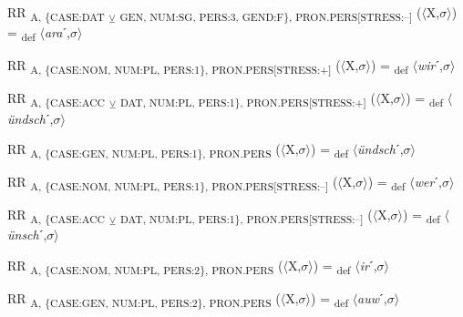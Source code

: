 {\begin{exe}
 RR \textsubscript{A, \{CASE:DAT} \textsubscript{${\veebar}$}\textsubscript{ GEN, NUM:SG, PERS:3, GEND:F\}, PRON.PERS[STRESS:–]} ($\langle$X,$\sigma $$\rangle$) = \textsubscript{def} $\langle$\textit{ara}ˊ,$\sigma $$\rangle$
\end{exe}

\begin{exe}
 RR \textsubscript{A, \{CASE:NOM, NUM:PL, PERS:1\}, PRON.PERS[STRESS:+]} ($\langle$X,$\sigma $$\rangle$) = \textsubscript{def} $\langle$\textit{wir}ˊ,$\sigma $$\rangle$
\end{exe}

\begin{exe}
 RR \textsubscript{A, \{CASE:ACC} \textsubscript{${\veebar}$}\textsubscript{ DAT, NUM:PL, PERS:1\}, PRON.PERS[STRESS:+]} ($\langle$X,$\sigma $$\rangle$) = \textsubscript{def} $\langle$\textit{ündsch}ˊ,$\sigma $$\rangle$
\end{exe}

\begin{exe}
 RR \textsubscript{A, \{CASE:GEN, NUM:PL, PERS:1\}, PRON.PERS} ($\langle$X,$\sigma $$\rangle$) = \textsubscript{def} $\langle$\textit{ündsch}ˊ,$\sigma $$\rangle$
\end{exe}

\begin{exe}
 RR \textsubscript{A, \{CASE:NOM, NUM:PL, PERS:1\}, PRON.PERS[STRESS:–]} ($\langle$X,$\sigma $$\rangle$) = \textsubscript{def} $\langle$\textit{wer}ˊ,$\sigma $$\rangle$
\end{exe}

\begin{exe}
 RR \textsubscript{A, \{CASE:ACC} \textsubscript{${\veebar}$}\textsubscript{ DAT, NUM:PL, PERS:1\}, PRON.PERS[STRESS:–]} ($\langle$X,$\sigma $$\rangle$) = \textsubscript{def} $\langle$\textit{ünsch}ˊ,$\sigma $$\rangle$
\end{exe}

\begin{exe}
 RR \textsubscript{A, \{CASE:NOM, NUM:PL, PERS:2\}, PRON.PERS} ($\langle$X,$\sigma $$\rangle$) = \textsubscript{def} $\langle$\textit{ir}ˊ,$\sigma $$\rangle$
\end{exe}

\begin{exe}
 RR \textsubscript{A, \{CASE:GEN, NUM:PL, PERS:2\}, PRON.PERS} ($\langle$X,$\sigma $$\rangle$) = \textsubscript{def} $\langle$\textit{auw}ˊ,$\sigma $$\rangle$
\end{exe}

}
